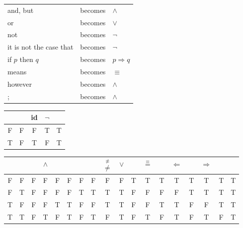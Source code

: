 \documentclass[letterpaper, 8pt]{extarticle}
\newcommand{\To}{\Rightarrow}
\begin{document}
\begin{multicols*}{3}
    \begin{center}
        \begin{tabulary}{\linewidth}{@{}LLL@{}}
            \toprule
            and, but                & becomes & $\land$   \\
            or                      & becomes & $\lor$    \\
            not                     & becomes & $\neg$    \\
            it is not the case that & becomes & $\neg$    \\
            if $p$ then $q$         & becomes & $p \To q$ \\
            means                   & becomes & $\equiv$  \\
            however                 & becomes & $\land$   \\
            ;                       & becomes & $\land$   \\
            \bottomrule
        \end{tabulary}
        \begin{tabulary}{\linewidth}{@{}C|CCCC@{}}
            \toprule
              &   & id & $\neg$ &   \\
            \midrule
            F & F & F  & T      & T \\
            T & F & T  & F      & T \\
            \bottomrule
        \end{tabulary}
        \begin{tabulary}{\linewidth}{@{}CC|CCCCCCCCCCCCCCCC}
            \toprule
              &   &   & $\land$ &   &   &   &   & $\overset{\not\equiv}{\neq}$ & $\lor$ &  & $\overset{\equiv}{=}$ &   & $\Leftarrow$ &   & $\Rightarrow$ &  &   \\
            \midrule
            F & F & F & F       & F & F & F & F & F                            & F      & T                   & T                     & T & T            & T & T             & T                    & T \\
            F & T & F & F       & F & F & T & T & T                            & T      & F                   & F                     & F & F            & T & T             & T                    & T \\
            T & F & F & F       & T & T & F & F & T                            & T      & F                   & F                     & T & T            & F & F             & T                    & T \\
            T & T & F & T       & F & T & F & T & F                            & T      & F                   & T                     & F & T            & F & T             & F                    & T \\
            \bottomrule
        \end{tabulary}
    \end{center}

\end{multicols*}
\end{document}
